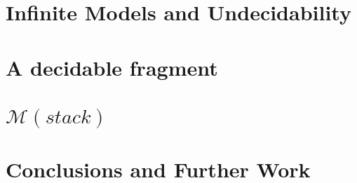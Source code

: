 \documentclass{elsarticle}
\newcommand{\MS}{\mathcal{M}(stack)}
\begin{document}
\section{Infinite Models and Undecidability}



\section{A decidable fragment}



\section{$\MS$}



\section{Conclusions and Further Work}




\end{document}
